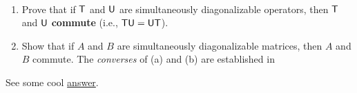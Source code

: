 \begin{exercise} \label{exercise 5.2.19} \ 

\begin{enumerate}
\item Prove that if \(\textsf{T}\) and \(\textsf{U}\) are simultaneously diagonalizable operators, then \(\textsf{T}\) and \(\textsf{U}\) \textbf{commute} (i.e., \(\textsf{T}\textsf{U} = \textsf{U}\textsf{T}\)).
\item Show that if \(A\) and \(B\) are simultaneously diagonalizable matrices, then \(A\) and \(B\) commute.
The \emph{converses} of (a) and (b) are established in 
\end{enumerate}
\end{exercise}

\begin{note}
See some cool \href{https://math.stackexchange.com/questions/236212/prove-that-simultaneously-diagonalizable-matrices-commute}{answer}.
\end{note}

